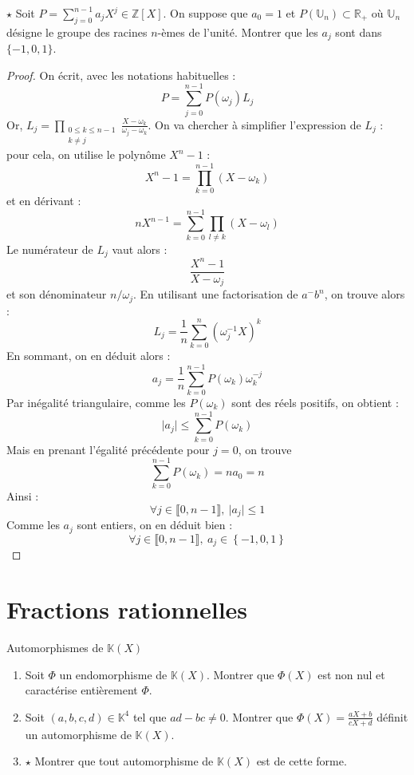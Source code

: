 \documentclass[french,a4paper]{article}
\newcommand{\Z}{\mathbb{Z}}
\newcommand{\R}{\mathbb{R}}
\newcommand{\K}{\mathbb{K}}
\newcommand{\U}{\mathbb{U}}
\newcommand{\inv}{^{-1}}
\theoremstyle{plain}
\theoremstyle{definition}
\theoremstyle{remark}
\begin{document}
\begin{ex}{$\star$}
	Soit $P=\displaystyle\sum_{j=0}^{n-1}a_jX^j\in\Z[X]$. On suppose que $a_0=1$ et $P(\U_n)\subset\R_+$ où $\U_n$ désigne le groupe des racines $n$-èmes de l'unité. Montrer que les $a_j$ sont dans $\{-1,0,1\}$.
\end{ex}
\begin{proof}
	On écrit, avec les notations habituelles : $$P=\sum_{j=0}^{n-1}P(\omega_j)L_j$$ Or, $L_j=\displaystyle\prod_{\substack{0\leqslant k\leqslant n-1\\ k\ne j}}\frac{X-\omega_k}{\omega_j-\omega_k}$. On va chercher à simplifier l'expression de $L_j$ : pour cela, on utilise le polynôme $X^n-1$ : $$X^n-1=\prod_{k=0}^{n-1}(X-\omega_k)$$ et en dérivant : $$nX^{n-1}=\sum_{k=0}^{n-1}\prod_{l\ne k}(X-\omega_l)$$ Le numérateur de $L_j$ vaut alors : $$\frac{X^n-1}{X-\omega_j}$$ et son dénominateur $n/\omega_j$. En utilisant une factorisation de $a^-b^n$, on trouve alors : $$L_j=\frac{1}{n}\sum_{k=0}^{n}(\omega_j\inv X)^k$$ En sommant, on en déduit alors : $$a_j=\frac{1}{n}\sum_{k=0}^{n-1}P(\omega_k)\omega_k^{-j}$$ Par inégalité triangulaire, comme les $P(\omega_k)$ sont des réels positifs, on obtient : $$\lvert a_j\rvert\leqslant\sum_{k=0}^{n-1}P(\omega_k)$$ Mais en prenant l'égalité précédente pour $j=0$, on trouve $$\sum_{k=0}^{n-1}P(\omega_k)=na_0=n$$ Ainsi : $$\forall j\in\llbracket0,n-1\rrbracket,\ \lvert a_j\rvert\leqslant 1$$ Comme les $a_j$ sont entiers, on en déduit bien : $$\forall j\in\llbracket0,n-1\rrbracket,\ a_j\in\left\{-1,0,1\right\}$$
\end{proof}

\section{Fractions rationnelles}

\begin{ex}{Automorphismes de $\K(X)$}
	\begin{enumerate}
		\item Soit $\Phi$ un endomorphisme de $\K(X)$. Montrer que $\Phi(X)$ est non nul et caractérise entièrement $\Phi$.
		\item Soit $(a,b,c,d)\in\K^4$ tel que $ad-bc\ne 0$. Montrer que $\Phi(X)=\displaystyle\frac{aX+b}{cX+d}$ définit un automorphisme de $\K(X)$.
		\item $\star$ Montrer que tout automorphisme de $\K(X)$ est de cette forme.
	\end{enumerate}
\end{ex}
\end{document}
